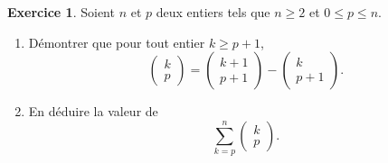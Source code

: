 \documentclass[a4paper, 11pt,openany]{article}%
\theoremstyle{plain}
\theoremstyle{definition}
\newtheorem{exo}{Exercice}
\theoremstyle{remark}
\begin{document}
\begin{exo}
Soient $n$ et $p$ deux entiers tels que $n\geqslant 2$ et $0\leqslant p \leqslant n$. 
\begin{enumerate}
      \item Démontrer que pour tout entier $k\geqslant p+1$, $$\begin{pmatrix} k \\ p \end{pmatrix} =\begin{pmatrix} k+1 \\ p+1 \end{pmatrix}-\begin{pmatrix} k \\ p+1 \end{pmatrix}.$$
      \item En déduire la valeur de $$\sum_{k=p}^n \begin{pmatrix} k \\ p \end{pmatrix}.$$
     \end{enumerate}
\end{exo}
\end{document}
